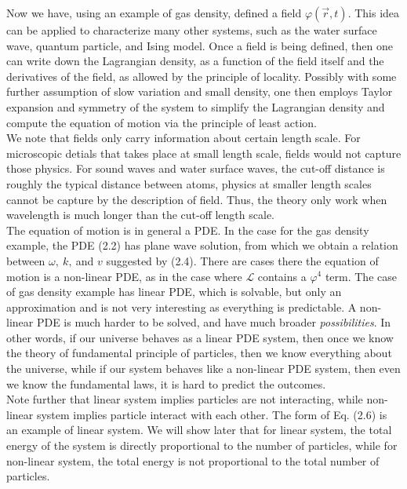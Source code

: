 \documentclass[11pt, onesided]{book}
\theoremstyle{break}
\theoremstyle{break}
\begin{document}
Now we have, using an example of gas density, defined a field $\varphi(\vec{r},t)$. This idea can be applied to characterize many other systems, such as the water surface wave, quantum particle, and Ising model. Once a field is being defined, then one can write down the Lagrangian density, as a function of the field itself and the derivatives of the field, as allowed by the principle of locality. Possibly with some further assumption of slow variation and small density, one then employs Taylor expansion and symmetry of the system to simplify the Lagrangian density and compute the equation of motion via the principle of least action. \\

We note that fields only carry information about certain length scale. For microscopic detials that takes place at small length scale, fields would not capture those physics. For sound waves and water surface waves, the cut-off distance is roughly the typical distance between atoms, physics at smaller length scales cannot be capture by the description of field. Thus, the theory only work when wavelength is much longer than the cut-off length scale. \\


The equation of motion is in general a PDE. In the case for the gas density example, the PDE (2.2) has plane wave solution, from which we obtain a relation between $\omega,\ k,\ $and $v$ suggested by (2.4). There are cases there the equation of motion is a non-linear PDE, as in the case where $\mathcal{L}$ contains a $\varphi^4$ term. The case of gas density example has linear PDE, which is solvable, but only an approximation and is not very interesting as everything is predictable. A non-linear PDE is much harder to be solved, and have much broader \textit{possibilities}. In other words, if our universe behaves as a linear PDE system, then once we know the theory of fundamental principle of particles, then we know everything about the universe, while if our system behaves like a non-linear PDE system, then even we know the fundamental laws, it is hard to predict the outcomes.\\

Note further that linear system implies particles are not interacting, while non-linear system implies particle interact with each other. The form of Eq. (2.6) is an example of linear system. We will show later that for linear system, the total energy of the system is directly proportional to the number of particles, while for non-linear system, the total energy is not proportional to the total number of particles.\\
\end{document}
